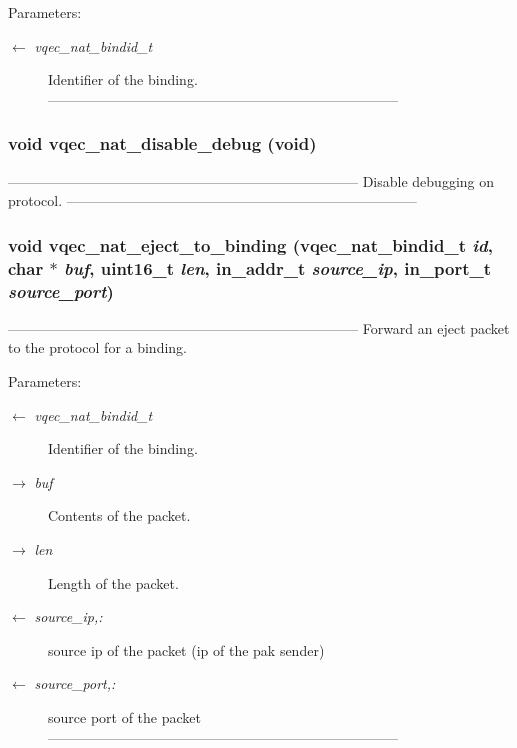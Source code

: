 \begin{Desc}
\item[Parameters:]
\begin{description}
\item[\mbox{$\leftarrow$} {\em vqec\_\-nat\_\-bindid\_\-t}]Identifier of the binding. --------------------------------------------------------------------------- \end{description}
\end{Desc}
\subsubsection{\setlength{\rightskip}{0pt plus 5cm}void vqec\_\-nat\_\-disable\_\-debug (void)}\label{vqec__nat__api_8c_64d18e023ac58deec48f819796f07917}


--------------------------------------------------------------------------- Disable debugging on protocol. --------------------------------------------------------------------------- 
\subsubsection{\setlength{\rightskip}{0pt plus 5cm}void vqec\_\-nat\_\-eject\_\-to\_\-binding (vqec\_\-nat\_\-bindid\_\-t {\em id}, char $\ast$ {\em buf}, uint16\_\-t {\em len}, in\_\-addr\_\-t {\em source\_\-ip}, in\_\-port\_\-t {\em source\_\-port})}\label{vqec__nat__api_8c_a72964d0432ce95945839d0ce77d6bc7}


--------------------------------------------------------------------------- Forward an eject packet to the protocol for a binding.

\begin{Desc}
\item[Parameters:]
\begin{description}
\item[\mbox{$\leftarrow$} {\em vqec\_\-nat\_\-bindid\_\-t}]Identifier of the binding. \item[\mbox{$\rightarrow$} {\em buf}]Contents of the packet. \item[\mbox{$\rightarrow$} {\em len}]Length of the packet. \item[\mbox{$\leftarrow$} {\em source\_\-ip,:}]source ip of the packet (ip of the pak sender) \item[\mbox{$\leftarrow$} {\em source\_\-port,:}]source port of the packet --------------------------------------------------------------------------- \end{description}
\end{Desc}
